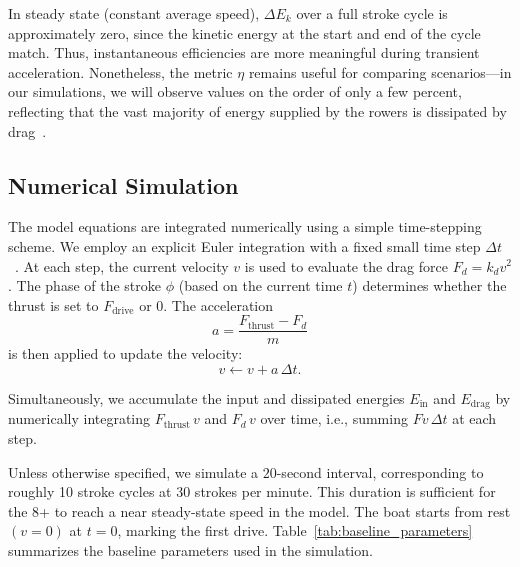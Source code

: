 \documentclass[12pt]{article}
\begin{document}
In steady state (constant average speed), $\Delta E_k$ over a full stroke cycle is approximately zero, since the kinetic energy at the start and end of the cycle match. Thus, instantaneous efficiencies are more meaningful during transient acceleration. Nonetheless, the metric \texorpdfstring{$\eta$}{eta} remains useful for comparing scenarios—in our simulations, we will observe values on the order of only a few percent, reflecting that the vast majority of energy supplied by the rowers is dissipated by drag~\cite{rowinginmotion2016}.

\newpage

\subsection{Numerical Simulation}

The model equations are integrated numerically using a simple time-stepping scheme. We employ an explicit Euler integration with a fixed small time step $\Delta t$~\cite{lazauskas1997, brearleydemestre1996, vanholst2004}. At each step, the current velocity $v$ is used to evaluate the drag force $F_d = k_d v^2$. The phase of the stroke $\phi$ (based on the current time $t$) determines whether the thrust is set to $F_{\text{drive}}$ or $0$. The acceleration
\[
a = \frac{F_{\text{thrust}} - F_d}{m}
\]
is then applied to update the velocity:
\[
v \leftarrow v + a\,\Delta t .
\]

Simultaneously, we accumulate the input and dissipated energies $E_{\text{in}}$ and $E_{\text{drag}}$ by numerically integrating $F_{\text{thrust}}\, v$ and $F_d\, v$ over time, i.e., summing $Fv\,\Delta t$ at each step.

Unless otherwise specified, we simulate a $20$-second interval, corresponding to roughly 10 stroke cycles at 30 strokes per minute. This duration is sufficient for the 8+ to reach a near steady-state speed in the model. The boat starts from rest $(v = 0)$ at $t = 0$, marking the first drive. Table~\ref{tab:baseline_parameters} summarizes the baseline parameters used in the simulation.
\end{document}
